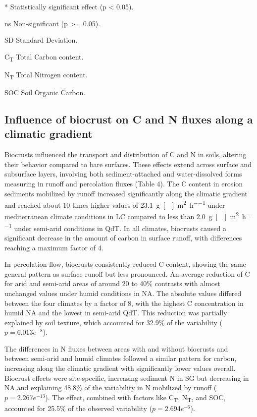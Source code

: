 \begin{table}[htbp]
\begin{threeparttable}
\begin{tablenotes}
      \item[*] Statistically significant effect (p < 0.05).
      \item[ns] Non-significant (p >= 0.05).
      \item[SD] Standard Deviation.
      \item[C\textsubscript{T}] Total Carbon content.
      \item[N\textsubscript{T}] Total Nitrogen content.
      \item[SOC] Soil Organic Carbon.
    \end{tablenotes}
  \end{threeparttable}
\end{table}

\subsection{Influence of biocrust on C and N fluxes along a climatic gradient}

Biocrusts influenced the transport and distribution of C and N in soils, altering their behavior compared to bare surfaces. These effects extend across surface and subsurface layers, involving both sediment-attached and water-dissolved forms measuring in runoff and percolation fluxes (Table 4). The C content in erosion sediments mobilized by runoff increased significantly along the climatic gradient and reached about 10 times higher values of \SI{23.1}{\gram[]\per\square\metre\per\hour} under mediterranean climate conditions in LC compared to less than \SI{2.0}{\gram[]\per\square\metre\per\hour} under semi-arid conditions in QdT. In all climates, biocrusts caused a significant decrease in the amount of carbon in surface runoff, with differences reaching a maximum factor of 4.
 
In percolation flow, biocrusts consistently reduced C content, showing the same general pattern as surface runoff but less pronounced. An average reduction of C for arid and semi-arid areas of around 20 to 40\% contrasts with almost unchanged values under humid conditions in NA. The absolute values differed between the four climates by a factor of 8, with the highest C concentration in humid NA and the lowest in semi-arid QdT. This reduction was partially explained by soil texture, which accounted for 32.9\% of the variability ($p = 6.013e^{-8}$).

The differences in N fluxes between areas with and without biocrusts and between semi-arid and humid climates followed a similar pattern for carbon, increasing along the climatic gradient with significantly lower values overall. Biocrust effects were site-specific, increasing sediment N in SG but decreasing in NA and explaining 48.8\% of the variability in N mobilized by runoff ($p = 2.267e^{-13}$). The effect, combined with factors like C\textsubscript{T}, N\textsubscript{T}, and SOC, accounted for 25.5\% of the observed variability ($p = 2.694e^{-6}$).

